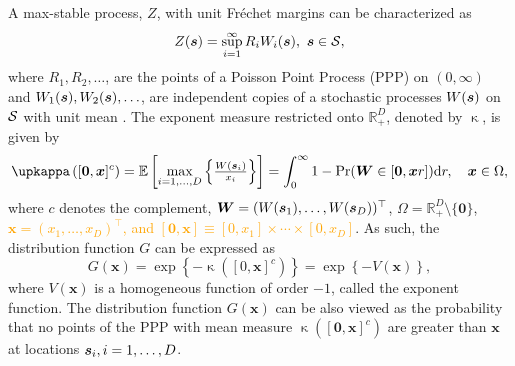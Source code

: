 \documentclass[12pt]{article}
\newcommand{\PZ}{\textcolor{orange}}
\begin{document}
A max-stable process, $Z$,  with unit Fr\'{e}chet margins can be characterized as
\begin{equation}
\label{eq:spectralrepresentation}
	Z({\boldsymbol{s}}) = \sup_{i=1}^\infty R_iW_i({\boldsymbol{s}}),\ {\boldsymbol{s}}\in{\mathcal{S}}, 
\end{equation}
%
where $R_1, R_2, \ldots$, are the points of a Poisson Point Process (PPP) on $(0, \infty)$ 
and $W_1({\boldsymbol{s}}), W_2({\boldsymbol{s}}), \ldots$, are independent copies of a stochastic processes $W({\boldsymbol{s}})$ on ${\mathcal{S}}$ with unit mean \citep{deHaan.Ferreira:2006, Schlather:2002}.
%
The exponent measure restricted onto $\mathbb R^D_+$, denoted by $\upkappa$, is given by
%
\begin{equation}
\label{eq:exponentmeasure}
\upkappa \left([\bm 0,\bm x]^c\right)
= \mathbb E\left[\max_{i=1, \ldots, D} \left\{\frac{W(\bs_i)}{x_i}\right\} \right] 
= \int_0^\infty 1 - \Pr(\bm W \in [\bm 0,\bm xr ])\text dr,	
\quad \bx \in \Omega,
\end{equation}
%
where $c$ denotes the complement, $\bm W=(W({\boldsymbol{s}}_1),\dots,W({\boldsymbol{s}}_D))^\top$, $\Omega = \mathbb R^{D}_+ \setminus \{\bm 0\}$, \PZ{$\bm x=(x_1,\dots,x_D)^\top$, and $[\bm 0,\bm x] \equiv [0,x_1]\times \cdots \times [0,x_D]$}. As such, the distribution function $G$ can be expressed as
\begin{equation}
\label{eq:ppp}
G(\bm x) = \exp\left\{-\upkappa([0,\bm x]^c)\right\} = \exp\left\{-V(\bm x)\right\},
\end{equation}
%
where $V(\bm x)$ is a homogeneous function of order $-1$, called the exponent function. The distribution function $G(\bm x)$ can be also viewed as the probability that no points of the PPP with mean measure $\upkappa \left([\bm 0,\bm x]^c\right)$ are greater than $\bm x$ at locations ${\boldsymbol{s}}_i,i=1,\dots,D$.     
\end{document}
